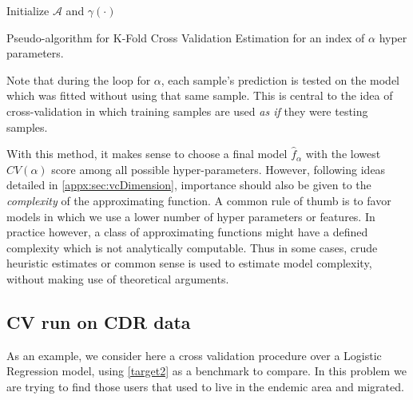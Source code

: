  \begin{algorithm}[H]
 \SetAlgoLined{}
 Initialize $\mathcal{A}$ and $\gamma(\cdot)$\;
 \caption{Pseudo-algorithm for K-Fold Cross Validation Estimation for an index of $\alpha$ hyper parameters.}
 \end{algorithm}

Note that during the loop for $\alpha$, each sample's prediction is tested on the model which was fitted without using that same sample.
This is central to the idea of cross-validation in which training samples are used \textit{as if} they were testing samples.

With this method, it makes sense to choose a final model $\hat{f}_\alpha$ with the lowest $CV(\alpha)$ score among all possible hyper-parameters.
However, following ideas detailed in \cref{appx:sec:vcDimension}, importance should also be given to the \textit{complexity} of the approximating function.
A common rule of thumb is to favor models in which we use a lower number of hyper parameters or features.
In practice however, a class of approximating functions might have a defined complexity which is not analytically computable.
Thus in some cases, crude heuristic estimates or common sense is used to estimate model complexity, without making use of theoretical arguments.


\subsection{CV run on CDR data}\label{subsection:cvExperiment}

As an example, we consider here a cross validation procedure over a Logistic Regression model, using \cref{target2} as a benchmark to compare.
In this problem we are trying to find those users that used to live in the endemic area and migrated.

